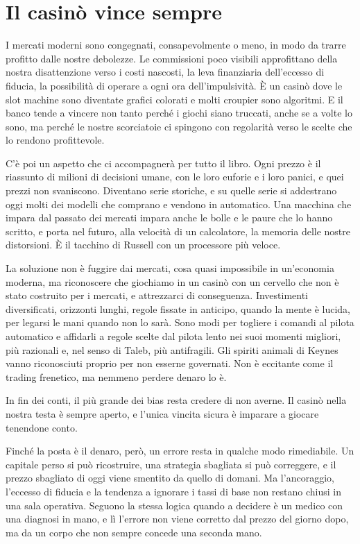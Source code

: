 \section{Il casin\`{o} vince sempre}

I mercati moderni sono congegnati, consapevolmente o meno, in modo da trarre profitto dalle nostre debolezze. Le commissioni poco visibili approfittano della nostra disattenzione verso i costi nascosti, la leva finanziaria dell'eccesso di fiducia, la possibilit\`{a} di operare a ogni ora dell'impulsivit\`{a}. \`{E} un casin\`{o} dove le slot machine sono diventate grafici colorati e molti croupier sono algoritmi. E il banco tende a vincere non tanto perch\'{e} i giochi siano truccati, anche se a volte lo sono, ma perch\'{e} le nostre scorciatoie ci spingono con regolarit\`{a} verso le scelte che lo rendono profittevole.

C'\`{e} poi un aspetto che ci accompagner\`{a} per tutto il libro. Ogni prezzo \`{e} il riassunto di milioni di decisioni umane, con le loro euforie e i loro panici, e quei prezzi non svaniscono. Diventano serie storiche, e su quelle serie si addestrano oggi molti dei modelli che comprano e vendono in automatico. Una macchina che impara dal passato dei mercati impara anche le bolle e le paure che lo hanno scritto, e porta nel futuro, alla velocit\`{a} di un calcolatore, la memoria delle nostre distorsioni. \`{E} il tacchino di Russell con un processore pi\`{u} veloce.

La soluzione non \`{e} fuggire dai mercati, cosa quasi impossibile in un'economia moderna, ma riconoscere che giochiamo in un casin\`{o} con un cervello che non \`{e} stato costruito per i mercati, e attrezzarci di conseguenza. Investimenti diversificati, orizzonti lunghi, regole fissate in anticipo, quando la mente \`{e} lucida, per legarsi le mani quando non lo sar\`{a}. Sono modi per togliere i comandi al pilota automatico e affidarli a regole scelte dal pilota lento nei suoi momenti migliori, pi\`{u} razionali e, nel senso di Taleb, pi\`{u} antifragili. Gli spiriti animali di Keynes vanno riconosciuti proprio per non esserne governati. Non \`{e} eccitante come il trading frenetico, ma nemmeno perdere denaro lo \`{e}.

In fin dei conti, il pi\`{u} grande dei bias resta credere di non averne. Il casin\`{o} nella nostra testa \`{e} sempre aperto, e l'unica vincita sicura \`{e} imparare a giocare tenendone conto.

Finch\'{e} la posta \`{e} il denaro, per\`{o}, un errore resta in qualche modo rimediabile. Un capitale perso si pu\`{o} ricostruire, una strategia sbagliata si pu\`{o} correggere, e il prezzo sbagliato di oggi viene smentito da quello di domani. Ma l'ancoraggio, l'eccesso di fiducia e la tendenza a ignorare i tassi di base non restano chiusi in una sala operativa. Seguono la stessa logica quando a decidere \`{e} un medico con una diagnosi in mano, e l\`{i} l'errore non viene corretto dal prezzo del giorno dopo, ma da un corpo che non sempre concede una seconda mano.
